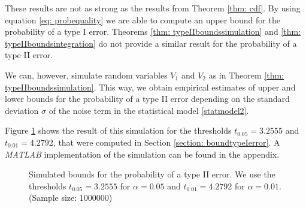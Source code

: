 \documentclass[a4paper,12pt]{article}
\theoremstyle{plain}
\theoremstyle{definition}
\begin{document}
These results are not as strong as the results from Theorem \ref{thm: cdf}. By using equation \eqref{eq: probequality} we are able to compute an upper bound for the probability of a type I error. Theorems \ref{thm: typeIIboundssimulation} and \ref{thm: typeIIboundsintegration} do not provide a similar result for the probability of a type II error.

We can, however, simulate random variables $V_1$ and $V_2$ as in Theorem \ref{thm: typeIIboundssimulation}. This way, we obtain empirical estimates of upper and lower bounds for the probability of a type II error depending on the standard deviation $\sigma$ of the noise term in the statistical model \eqref{statmodel2}.

Figure \ref{fig: simulatedboundstypeIIerror} shows the result of this simulation for the thresholds $t_{0.05} = 3.2555$ and $t_{0.01} = 4.2792$, that were computed in Section \ref{section: boundtypeIerror}. A \emph{MATLAB} implementation of the simulation can be found in the appendix.

\begin{figure}[h!]
	\centering
	\caption{Simulated bounds for the probability of a type II error. We use the thresholds $t_{0.05} = 3.2555$ for $\alpha = 0.05$ and $t_{0.01} = 4.2792$ for $\alpha = 0.01$. (Sample size: $1000000$)}
	\label{fig: simulatedboundstypeIIerror}
\end{figure}
\end{document}
